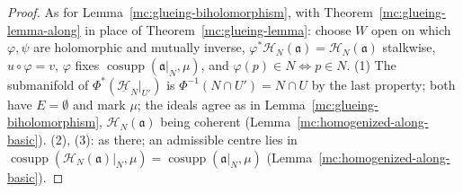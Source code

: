 \begin{proof}
\leanok
As for Lemma~\ref{mc:glueing-biholomorphism}, with Theorem~\ref{mc:glueing-lemma-along} in place of Theorem~\ref{mc:glueing-lemma}: choose \(W\) open on which \(\varphi,\psi\) are
holomorphic and mutually inverse, \(\varphi^*\mathcal H_N(\mathfrak a)=\mathcal H_N(\mathfrak a)\) stalkwise, \(u\circ\varphi=v\), \(\varphi\) fixes \(\operatorname{cosupp}(\mathfrak a|_N,\mu)\), and
\(\varphi(p)\in N\iff p\in N\). (1) The submanifold of \(\Phi^*(\underline{\mathcal H}_N|_{U'})\) is \(\Phi^{-1}(N\cap U')=N\cap U\) by the last property; both have \(E=\emptyset\) and mark
\(\mu\); the ideals agree as in Lemma~\ref{mc:glueing-biholomorphism}, \(\mathcal H_N(\mathfrak a)\) being coherent (Lemma~\ref{mc:homogenized-along-basic}). (2), (3): as there; an
admissible centre lies in \(\operatorname{cosupp}(\mathcal H_N(\mathfrak a)|_N,\mu)=\operatorname{cosupp}(\mathfrak a|_N,\mu)\) (Lemma~\ref{mc:homogenized-along-basic}).
\end{proof}

